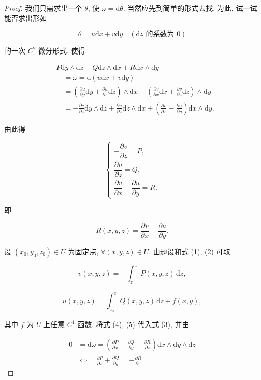 \begin{proof}

我们只需求出一个 $\theta$, 使 $\omega=\mathrm{d}\theta$. 当然应先到简单的形式去找. 为此, 试一试能否求出形如

\[
\theta=u\mathrm{d}x+v\mathrm{d}y\quad(\mathrm{d}z\text{ 的系数为 }0)
\]

的一次 $C^{2}$ 微分形式, 使得

\[
\begin{aligned}
&P\mathrm{d}y\wedge\mathrm{d}z+Q\mathrm{d}z\wedge\mathrm{d}x+R\mathrm{d}x\wedge\mathrm{d}y\\
&\quad=\omega=\mathrm{d}(u\mathrm{d}x+v\mathrm{d}y)\\
&\quad=\left(\frac{\partial u}{\partial y}\mathrm{d}y+\frac{\partial u}{\partial z}\mathrm{d}z\right)\wedge\mathrm{d}x
   +\left(\frac{\partial v}{\partial x}\mathrm{d}x+\frac{\partial v}{\partial z}\mathrm{d}z\right)\wedge\mathrm{d}y\\
&\quad=-\frac{\partial v}{\partial z}\mathrm{d}y\wedge\mathrm{d}z
     +\frac{\partial u}{\partial z}\mathrm{d}z\wedge\mathrm{d}x
     +\left(\frac{\partial v}{\partial x}-\frac{\partial u}{\partial y}\right)\mathrm{d}x\wedge\mathrm{d}y.
\end{aligned}
\tag{1}
\]

由此得

\[
\begin{cases}
-\dfrac{\partial v}{\partial z}=P,\\[6pt]
\dfrac{\partial u}{\partial z}=Q,\\[6pt]
\dfrac{\partial v}{\partial x}-\dfrac{\partial u}{\partial y}=R.
\end{cases}
\tag{2}
\]

即

\[
R(x,y,z)=\frac{\partial v}{\partial x}-\frac{\partial u}{\partial y}.
\tag{3}
\]

设 $(x_{0},y_{0},z_{0})\in U$ 为固定点, $\forall(x,y,z)\in U$. 由题设和式 (1), (2) 可取

\[
v(x,y,z)=-\int_{z_{0}}^{z}P(x,y,z)\,\mathrm{d}z,
\tag{4}
\]

\[
u(x,y,z)=\int_{z_{0}}^{z}Q(x,y,z)\,\mathrm{d}z+f(x,y),
\tag{5}
\]

其中 $f$ 为 $U$ 上任意 $C^{1}$ 函数. 将式 (4), (5) 代入式 (3), 并由

\[
\begin{aligned}
0&=\mathrm{d}\omega=\left(\frac{\partial P}{\partial x}+\frac{\partial Q}{\partial y}+\frac{\partial R}{\partial z}\right)\mathrm{d}x\wedge\mathrm{d}y\wedge\mathrm{d}z\\
&\Leftrightarrow\quad\frac{\partial P}{\partial x}+\frac{\partial Q}{\partial y}=-\frac{\partial R}{\partial z}
\end{aligned}
\tag{6}
\]


\end{proof}
